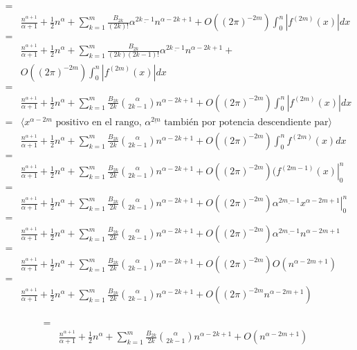 \documentclass{article}
\begin{document}
\begin{align*}
= & \\
& \frac{n^{\alpha+1}}{\alpha+1}
  + \frac{1}{2} n^\alpha + \sum_{k=1}^m \frac{B_{2k}}{(2k)!} \alpha^{\underline{2k-1}} n^{\alpha-2k+1} +
  O((2\pi)^{-2m}) \int_0^n | f^{(2m)}(x) | dx \\
= & \\
& \frac{n^{\alpha+1}}{\alpha+1}
  + \frac{1}{2} n^\alpha + \sum_{k=1}^m \frac{B_{2k}}{(2k)(2k-1)!} \alpha^{\underline{2k-1}} n^{\alpha-2k+1} + \\
& O((2\pi)^{-2m}) \int_0^n | f^{(2m)}(x) | dx \\
= & \\
& \frac{n^{\alpha+1}}{\alpha+1}
  + \frac{1}{2} n^\alpha + \sum_{k=1}^m \frac{B_{2k}}{2k} \binom{\alpha}{2k-1} n^{\alpha-2k+1} + 
  O((2\pi)^{-2m}) \int_0^n | f^{(2m)}(x) | dx \\
= & \langle x^{\alpha-2m} \text{ positivo en el rango, } \alpha^{\underline{2m}} \text{ también por potencia descendiente par} \rangle \\
& \frac{n^{\alpha+1}}{\alpha+1}
  + \frac{1}{2} n^\alpha + \sum_{k=1}^m \frac{B_{2k}}{2k} \binom{\alpha}{2k-1} n^{\alpha-2k+1} + 
  O((2\pi)^{-2m}) \int_0^n f^{(2m)}(x) dx \\
= & \\
& \frac{n^{\alpha+1}}{\alpha+1}
  + \frac{1}{2} n^\alpha + \sum_{k=1}^m \frac{B_{2k}}{2k} \binom{\alpha}{2k-1} n^{\alpha-2k+1} + 
  O((2\pi)^{-2m}) \left. (f^{(2m-1)}(x) \right|_0^n  \\
= & \\
& \frac{n^{\alpha+1}}{\alpha+1}
  + \frac{1}{2} n^\alpha + \sum_{k=1}^m \frac{B_{2k}}{2k} \binom{\alpha}{2k-1} n^{\alpha-2k+1} + 
  O((2\pi)^{-2m}) \left. \alpha^{\underline{2m-1}} x^{\alpha-2m+1} \right|_0^n  \\
= & \\
& \frac{n^{\alpha+1}}{\alpha+1}
  + \frac{1}{2} n^\alpha + \sum_{k=1}^m \frac{B_{2k}}{2k} \binom{\alpha}{2k-1} n^{\alpha-2k+1} + 
  O((2\pi)^{-2m}) \alpha^{\underline{2m-1}} n^{\alpha-2m+1}  \\
= & \\
& \frac{n^{\alpha+1}}{\alpha+1}
  + \frac{1}{2} n^\alpha + \sum_{k=1}^m \frac{B_{2k}}{2k} \binom{\alpha}{2k-1} n^{\alpha-2k+1} + 
  O((2\pi)^{-2m}) O(n^{\alpha-2m+1})  \\
= & \\
& \frac{n^{\alpha+1}}{\alpha+1}
  + \frac{1}{2} n^\alpha + \sum_{k=1}^m \frac{B_{2k}}{2k} \binom{\alpha}{2k-1} n^{\alpha-2k+1} + 
  O((2\pi)^{-2m} n^{\alpha-2m+1})  \\
\end{align*}

\begin{align*}
= & \\
& \frac{n^{\alpha+1}}{\alpha+1}
  + \frac{1}{2} n^\alpha + \sum_{k=1}^m \frac{B_{2k}}{2k} \binom{\alpha}{2k-1} n^{\alpha-2k+1} + 
  O(n^{\alpha-2m+1})  \\
\end{align*}
\end{document}
